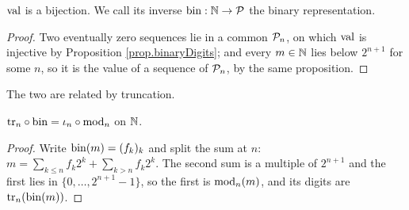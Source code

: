 \begin{prop}\label{prop.binaryRepresentation}
 $\mathrm{val}$ is a bijection.
 We call its inverse $\mathrm{bin} : \mathbb{N} \to \mathcal{P}$ the binary representation.
\end{prop}
\begin{proof}
 Two eventually zero sequences lie in a common $\mathcal{P}_{n}$,
 on which $\mathrm{val}$ is injective by Proposition \ref{prop.binaryDigits};
 and every $m \in \mathbb{N}$ lies below $2^{n+1}$ for some $n$,
 so it is the value of a sequence of $\mathcal{P}_{n}$, by the same proposition.
\end{proof}

The two are related by truncation.

\begin{prop}\label{prop.truncationCommutes}
 $\mathrm{tr}_{n} \circ \mathrm{bin} = \iota_{n} \circ \mathrm{mod}_{n}$ on $\mathbb{N}$.
\end{prop}
\begin{proof}
 Write $\mathrm{bin}(m) = (f_k)_k$ and split the sum at $n$:
 $m = \sum_{k \leq n} f_k 2^k + \sum_{k > n} f_k 2^k$.
 The second sum is a multiple of $2^{n+1}$ and the first lies in
 $\lbrace 0, \dots, 2^{n+1} - 1 \rbrace$, so the first is $\mathrm{mod}_{n}(m)$,
 and its digits are $\mathrm{tr}_{n}(\mathrm{bin}(m))$.
\end{proof}
